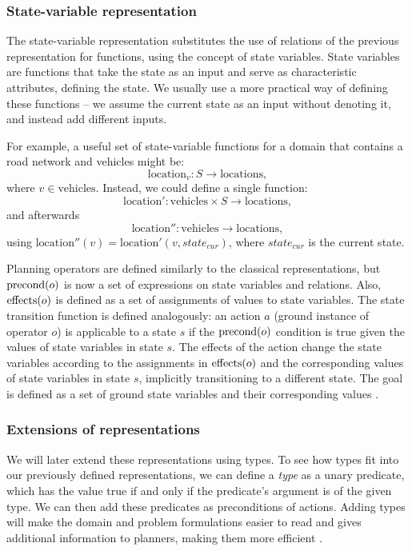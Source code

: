 \subsubsection{State-variable representation}

The state-variable representation substitutes the use of relations of the previous
representation for functions,
using the concept of state variables. State variables are functions
that take the state as an input and serve as characteristic attributes, defining the state. We usually use a more practical way of defining these functions -- we assume
the current state as an input without denoting it, and instead add different inputs.

For example, a useful set of state-variable functions for a domain that contains a road
network and vehicles might be: $$\mathrm{location}_{v}: S \to \mathrm{locations},$$
where $v \in \mathrm{vehicles}$.
Instead, we could define a single function:
$$\mathrm{location'}: \mathrm{vehicles} \times S \to \mathrm{locations},$$
and afterwards 
$$\mathrm{location''}: \mathrm{vehicles} \to \mathrm{locations},$$
using $\mathrm{location''}(v) = \mathrm{location'}(v, state_{cur})$, where $state_{cur}$ is the current state.

Planning operators are defined similarly to the classical representations, but
$\operatorname{\textrm{precond}}(o)$ is now a set of expressions on state variables and relations.
Also, $\operatorname{\textrm{effects}}(o)$ is defined as a set of assignments of values to state variables.
The state transition function is defined analogously: an action $a$ (ground instance
of operator $o$)
is applicable to a state $s$ if the $\operatorname{\textrm{precond}}(o)$ condition is true given the values
of state variables in state $s$. The effects of the action change the state variables
according to the assignments in $\operatorname{\textrm{effects}}(o)$ and the corresponding values of state
variables in state $s$, implicitly transitioning to a different state.
The goal is defined as a set of ground state variables and their corresponding values
\citep[Section~2.5.2]{Ghallab2004}.


\subsubsection{Extensions of representations}

We will later extend these representations using types.
To see how types fit into our previously defined representations, we can
define a \textit{type} as a unary predicate, which has the value true
if and only if the predicate's argument is of the given type.
We can then add these predicates as preconditions of actions.
Adding types will make the domain and problem formulations
easier to read and gives additional information
to planners, making them more efficient \citep[Section 2.4.1]{Ghallab2004}.


